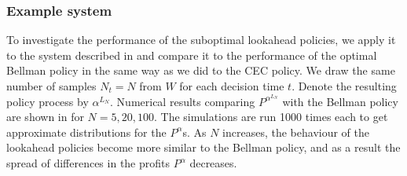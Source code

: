 \documentclass[main.tex]{subfiles}
\begin{document}
\subsubsection{Example system}
To investigate the performance of the suboptimal lookahead
policies, we apply it to the system described in
 and compare it to the performance
of the optimal Bellman policy in the same way as we did to the CEC
policy. We draw the same number of samples $N_t=N$ from $W$ for each
decision time $t$. Denote the resulting policy process
by $\alpha^{L_N}$. Numerical results comparing $P^{\alpha^{L_N}}$ with the
Bellman policy are shown in 
for $N=5,20,100$. The simulations are run 1000 times each to get
approximate distributions for the $P^\alpha$s.
As $N$ increases, the behaviour of the lookahead policies become more
similar to the Bellman policy, and as a result the spread of differences in the
profits $P^\alpha$ decreases.
\end{document}
